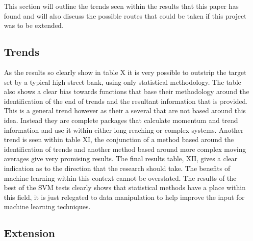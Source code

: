 \documentclass[conference]{IEEEtran}
\begin{document}
\iffalse
This section summarises the main points of this paper.  Do not replicate the abstract as the conclusion.  A conclusion might elaborate on the importance of the work or suggest applications and extensions.  This section should be no more than 1 page in length.

- extend the number of stat methods used \\
- test using more data, multiple sources, more complete, more fine grain \\
- test more ML methods - NN or K-Means or Genetic algorithm for each stock\\
- use live data? \\
- stop and put? \\
\fi

This section will outline the trends seen within the results that this paper has found and will also discuss the possible routes that could be taken if this project was to be extended.

\subsection*{Trends}

As the results so clearly show in table X it is very possible to outstrip the target set by a typical high street bank, using only statistical methodology. The table also shows a clear bias towards functions that base their methodology around the identification of the end of trends and the resultant information that is provided. This is a general trend however as their a several that are not based around this idea. Instead they are complete packages that calculate momentum and trend information and use it within either long reaching or complex systems. 
Another trend is seen within table XI, the conjunction of a method based around the identification of trends and another method based around more complex moving averages give very promising results. 
The final results table, XII, gives a clear indication as to the direction that the research should take. The benefits of machine learning within this context cannot be overstated. The results of the best of the SVM tests clearly shows that statistical methods have a place within this field, it is just relegated to data manipulation to help improve the input for machine learning techniques.\\

\subsection*{Extension}
\end{document}
